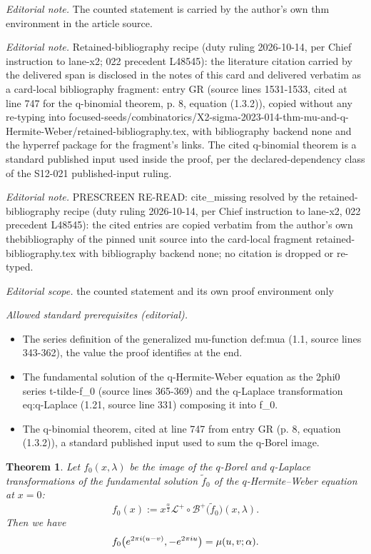 \documentclass[10pt,a4paper]{article}
\numberwithin{equation}{section}
\newtheorem{thm}{Theorem}[section]
\theoremstyle{definition}
\begin{document}
\noindent\textit{Editorial note.} The counted statement is carried by the author's own thm environment in the article source.\par\medskip
\noindent\textit{Editorial note.} Retained-bibliography recipe (duty ruling 2026-10-14, per Chief instruction to lane-x2; 022 precedent L48545): the literature citation carried by the delivered span is disclosed in the notes of this card and delivered verbatim as a card-local bibliography fragment: entry GR (source lines 1531-1533, cited at line 747 for the q-binomial theorem, p. 8, equation (1.3.2)), copied without any re-typing into focused-seeds/combinatorics/X2-sigma-2023-014-thm-mu-and-q-Hermite-Weber/retained-bibliography.tex, with bibliography backend none and the hyperref package for the fragment's links. The cited q-binomial theorem is a standard published input used inside the proof, per the declared-dependency class of the S12-021 published-input ruling.\par\medskip
\noindent\textit{Editorial note.} PRESCREEN RE-READ: cite\_missing resolved by the retained-bibliography recipe (duty ruling 2026-10-14, per Chief instruction to lane-x2, 022 precedent L48545): the cited entries are copied verbatim from the author's own thebibliography of the pinned unit source into the card-local fragment retained-bibliography.tex with bibliography backend none; no citation is dropped or re-typed.\par\medskip
\noindent\textit{Editorial scope.} the counted statement and its own proof environment only\par\medskip
\noindent\textit{Allowed standard prerequisites (editorial).}\begin{itemize}
\item The series definition of the generalized mu-function def:mua (1.1, source lines 343-362), the value the proof identifies at the end.
\item The fundamental solution of the q-Hermite-Weber equation as the 2phi0 series t-tilde-f\_0 (source lines 365-369) and the q-Laplace transformation eq:q-Laplace (1.21, source line 331) composing it into f\_0.
\item The q-binomial theorem, cited at line 747 from entry GR (p. 8, equation (1.3.2)), a standard published input used to sum the q-Borel image.
\end{itemize}\medskip
\begin{thm}\label{thm:mu and q-Hermite--Weber}
Let $f_{0}(x,\lambda )$ be the image of the $q$-Borel and $q$-Laplace transformations of the fundamental solution $\widetilde{f}_{0}$ of the $q$-Hermite--Weber equation at $x=0$:
\[
f_{0}(x)
 :=
 x^{\frac{\alpha }{2}}\mathcal{L}^{+}\circ\mathcal{B}^{+}\big(\widetilde{f}_{0}\big)(x,\lambda).
\]
Then we have
\begin{gather}\label{eq:mu and q-Hermite--Weber}
f_{0}\big({\rm e}^{2\pi{\rm i}(u-v)},-{\rm e}^{2\pi{\rm i}u}\big)
 =\mu(u,v;\alpha).
\end{gather}
\end{thm}
\end{document}
